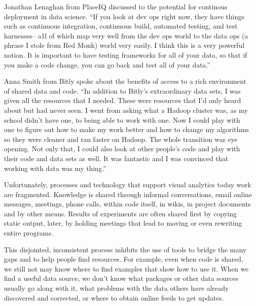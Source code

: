 Jonathan Lenaghan from PlaceIQ discussed to the potential
for continous deployment in data science.
``If you look at dev ops right now, they have things
such as continuous integration, continuous build,
automated testing, and test harnesses-- a1l of which
map very well from the dev ops world to the data ops
(a phrase I stole from Red Monk) world very easily. I
think this is a very powerful notion. It is important to
have testing frameworks for all of your data, so that if
you make a code change, you can go back and test all
of your data.''

Anna Smith from Bitly spoke about the benefits of access to
a rich environment of shared data and code.
``In addition to Bitly's extraordinary data sets,
I was given all the resources that I needed. These were
resources that I’d only heard about but had never
seen. I went from asking what a Hadoop cluster was,
as my school didn't have one, to being able to work
with one. Now I could play with one to figure out how
to make my work better and how to change my
algorithms so they were cleaner and ran faster on
Hadoop. The whole transition was eye opening. Not
only that, I could also look at other people’s code and
play with their code and data sets as well. It was
fantastic and I was convinced that working with data was my thing.''


Unfortunately, processes and technology that support visual analytics today
work are fragmented.
Knowledge is shared through informal conversations, email online messages,
meetings, phone calls, within code itself, in wikis, in project documents and
by other means. Results of experiments are often shared first by copying static
output, later, by holding meetings that lead to moving or even rewriting
entire programs.

This disjointed, inconsistent process inhibits the use of tools to bridge
the many gaps and to help people find resources.
For example, even when code is shared, we still not may know where to
find examples that show how to use it.
When we find a useful data source, we don't know what packages or
other data sources usually go along with it, what problems with the data
others have already discovered and corrected, or where to obtain online feeds
to get updates.

